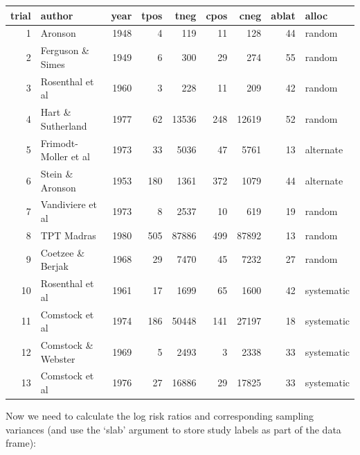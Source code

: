 \documentclass[
  11pt,
]{article}
\begin{document}
\begin{tabular}{r|l|r|r|r|r|r|r|l}
\hline
trial & author & year & tpos & tneg & cpos & cneg & ablat & alloc\\
\hline
1 & Aronson & 1948 & 4 & 119 & 11 & 128 & 44 & random\\
\hline
2 & Ferguson \& Simes & 1949 & 6 & 300 & 29 & 274 & 55 & random\\
\hline
3 & Rosenthal et al & 1960 & 3 & 228 & 11 & 209 & 42 & random\\
\hline
4 & Hart \& Sutherland & 1977 & 62 & 13536 & 248 & 12619 & 52 & random\\
\hline
5 & Frimodt-Moller et al & 1973 & 33 & 5036 & 47 & 5761 & 13 & alternate\\
\hline
6 & Stein \& Aronson & 1953 & 180 & 1361 & 372 & 1079 & 44 & alternate\\
\hline
7 & Vandiviere et al & 1973 & 8 & 2537 & 10 & 619 & 19 & random\\
\hline
8 & TPT Madras & 1980 & 505 & 87886 & 499 & 87892 & 13 & random\\
\hline
9 & Coetzee \& Berjak & 1968 & 29 & 7470 & 45 & 7232 & 27 & random\\
\hline
10 & Rosenthal et al & 1961 & 17 & 1699 & 65 & 1600 & 42 & systematic\\
\hline
11 & Comstock et al & 1974 & 186 & 50448 & 141 & 27197 & 18 & systematic\\
\hline
12 & Comstock \& Webster & 1969 & 5 & 2493 & 3 & 2338 & 33 & systematic\\
\hline
13 & Comstock et al & 1976 & 27 & 16886 & 29 & 17825 & 33 & systematic\\
\hline
\end{tabular}

Now we need to calculate the log risk ratios and corresponding sampling variances (and use the `slab' argument to store study labels as part of the data frame):
\end{document}

